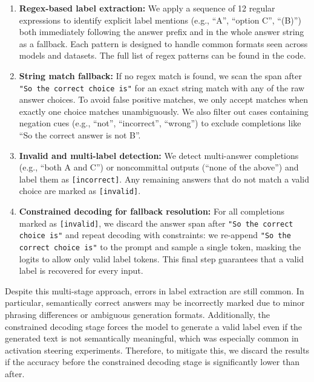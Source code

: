 \documentclass{article} %
\begin{document}
\begin{enumerate}
    \item \textbf{Regex-based label extraction:} We apply a sequence of 12 regular expressions to identify explicit label mentions (e.g., “A”, “option C”, “(B)”) both immediately following the answer prefix and in the whole answer string as a fallback. Each pattern is designed to handle common formats seen across models and datasets. The full list of regex patterns can be found in the code.
    
    \item \textbf{String match fallback:} If no regex match is found, we scan the span after \texttt{"So the correct choice is"} for an exact string match with any of the raw answer choices. To avoid false positive matches, we only accept matches when exactly one choice matches unambiguously. We also filter out cases containing negation cues (e.g., “not”, “incorrect”, “wrong”) to exclude completions like “So the correct answer is not B”.
    
    \item \textbf{Invalid and multi-label detection:} We detect multi-answer completions (e.g., “both A and C”) or noncommittal outputs (“none of the above”) and label them as \texttt{[incorrect]}. Any remaining answers that do not match a valid choice are marked as \texttt{[invalid]}.

    \item \textbf{Constrained decoding for fallback resolution:} For all completions marked as \texttt{[invalid]}, we discard the answer span after \texttt{"So the correct choice is"} and repeat decoding with constraints: we re-append \texttt{"So the correct choice is"} to the prompt and sample a single token, masking the logits to allow only valid label tokens. This final step guarantees that a valid label is recovered for every input.
\end{enumerate}

Despite this multi-stage approach, errors in label extraction are still common. In particular, semantically correct answers may be incorrectly marked due to minor phrasing differences or ambiguous generation formats. Additionally, the constrained decoding stage forces the model to generate a valid label even if the generated text is not semantically meaningful, which was especially common in activation steering experiments. Therefore, to mitigate this, we discard the results if the accuracy before the constrained decoding stage is significantly lower than after. 
\end{document}
